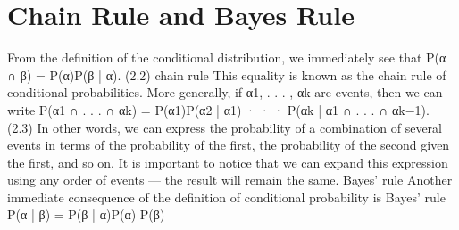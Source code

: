 \section{Chain Rule and Bayes Rule}

From the definition of the conditional distribution, we immediately see that P(α ∩ β) = P(α)P(β | α). (2.2) chain rule This equality is known as the chain rule of conditional probabilities. More generally, if α1, . . . , αk are events, then we can write P(α1 ∩ . . . ∩ αk) = P(α1)P(α2 | α1) · · · P(αk | α1 ∩ . . . ∩ αk−1). (2.3) In other words, we can express the probability of a combination of several events in terms of the probability of the first, the probability of the second given the first, and so on. It is important to notice that we can expand this expression using any order of events — the result will remain the same. Bayes’ rule Another immediate consequence of the definition of conditional probability is Bayes’ rule P(α | β) = P(β | α)P(α) P(β)

